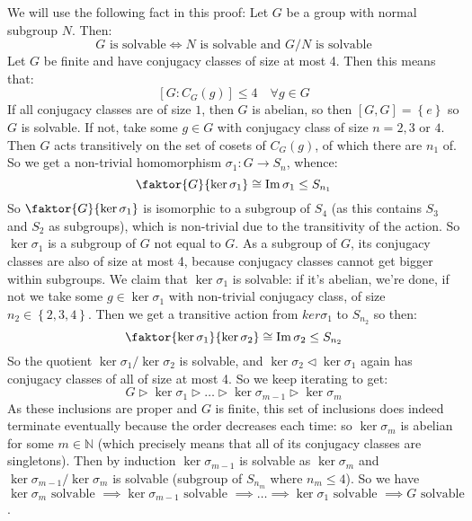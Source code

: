 \documentclass[12pt]{extarticle}
\DeclareMathOperator{\im}{Im}
\newcommand{\NN}{\mathbb{N}}
\newcommand{\set}[1]{\left\{ #1  \right\}}
\begin{document}
\begin{enumerate}[1)]
    We will use the following fact in this proof: Let \(G\) be a group with normal subgroup \(N\). Then:
    \[
    G \text{ is solvable} \iff N \text{ is solvable and } G/N \text{ is solvable}
    \]
    Let \(G\) be finite and have conjugacy classes of size at most 4. Then this means that:
    \[
    [ G \colon C_{G}(g) ] \leq 4 \quad \forall g \in G
    \]
    If all conjugacy classes are of size \(1\), then \(G\) is abelian, so then \( [G,G] = \set{e}\) so \(G\) is solvable. If not, take some \(g \in G\) with conjugacy class of size \(n = 2,3 \text{ or } 4\). Then \(G\) acts transitively on the set of cosets of \(C_{G}(g)\), of which there are \(n_{1}\) of. So we get a non-trivial homomorphism \( \sigma_{1} \colon G \to S_{n} \), whence:
    \[
    \faktor{G}{\ker \sigma_{1}} \cong \im \sigma_{1} \leq S_{n_1}
    \]
    So \(\faktor{G}{\ker \sigma_{1}}\) is isomorphic to a subgroup of \(S_{4}\) (as this contains \(S_3\) and \(S_2\) as subgroups), which is non-trivial due to the transitivity of the action. So \(\ker \sigma_{1}\) is a subgroup of \(G\) not equal to \(G\). As a subgroup of \(G\), its conjugacy classes are also of size at most 4, because conjugacy classes cannot get bigger within subgroups. We claim that \(\ker \sigma_{1}\) is solvable: if it's abelian, we're done, if not we take some \(g \in \ker \sigma_{1}\) with non-trivial conjugacy class, of size \(n_{2} \in \set{2,3,4}\). Then we get a transitive action from \(ker \sigma_{1}\) to \(S_{n_2}\) so then:
    \[
    \faktor{\ker \sigma_{1}}{\ker \sigma_{2}} \cong \im \sigma_{2} \leq S_{n_2}
    \]
    So the quotient \( \ker \sigma_{1}/ \ker \sigma_{2}\) is solvable, and \(\ker \sigma_{2} \lhd \ker \sigma_{1}\) again has conjugacy classes of all of size at most 4. So we keep iterating to get:
    \[
     G \triangleright \ker \sigma_{1}  \triangleright \dots \triangleright \ker \sigma_{m-1} \triangleright \ker \sigma_{m}
    \]
    As these inclusions are proper and \(G\) is finite, this set of inclusions does indeed terminate eventually because the order decreases each time: so \(\ker \sigma_{m}\) is abelian for some \(m \in \NN\) (which precisely means that all of its conjugacy classes are singletons). Then by induction \(\ker \sigma_{m-1}\) is solvable as \(\ker \sigma_{m}\) and \(\ker \sigma_{m-1} / \ker \sigma_{m}\) is solvable (subgroup of \(S_{n_{m}}\) where \( n_{m} \leq 4\)). So we have \(\ker \sigma_{m} \text{ solvable } \implies \ker \sigma_{m-1} \text{ solvable } \implies \dots \implies \ker \sigma_{1} \text{ solvable } \implies G \text{ solvable }\).
    

\end{enumerate}
\end{document}
